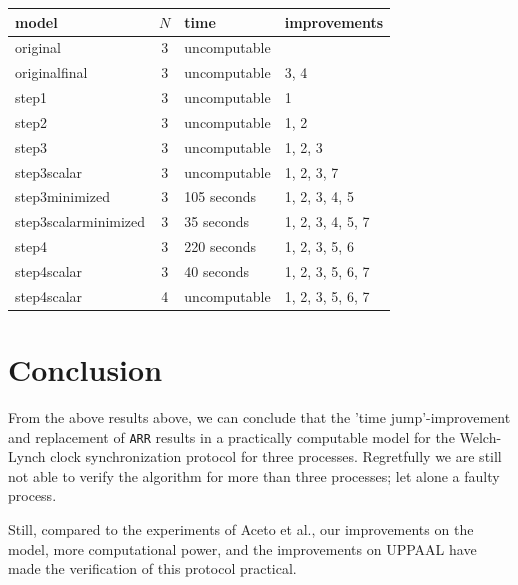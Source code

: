 \documentclass[a4paper,10pt]{article}
\begin{document}
\vspace{1 em}

\begin{tabular}{|l|c|l|l|}
\hline
\textbf{model} & \textbf{$N$} & \textbf{time} & \textbf{improvements} \\ \hline
original & 3 & uncomputable & \\ \hline
originalfinal & 3 & uncomputable & 3, 4 \\ \hline
step1 & 3 & uncomputable & 1 \\ \hline
step2 & 3 & uncomputable & 1, 2 \\ \hline
step3 & 3 & uncomputable & 1, 2, 3 \\ \hline
step3scalar & 3 & uncomputable & 1, 2, 3, 7 \\ \hline
step3minimized & 3 & 105 seconds & 1, 2, 3, 4, 5 \\ \hline
step3scalarminimized & 3 & 35 seconds & 1, 2, 3, 4, 5, 7 \\ \hline
step4 & 3 & 220 seconds & 1, 2, 3, 5, 6\\ \hline
step4scalar & 3 & 40 seconds & 1, 2, 3, 5, 6, 7 \\ \hline
step4scalar & 4 & uncomputable & 1, 2, 3, 5, 6, 7 \\ \hline
\end{tabular}


\section{Conclusion}
	

From the above results above, we can conclude that the 'time jump'-improvement and replacement of \texttt{ARR} results in a practically computable model for the Welch-Lynch clock synchronization protocol for three processes. Regretfully we are still not able to verify the algorithm for more than three processes; let alone a faulty process.

Still, compared to the experiments of Aceto et al., our improvements on the model, more computational power, and the improvements on UPPAAL have made the verification of this protocol practical.



\end{document}
